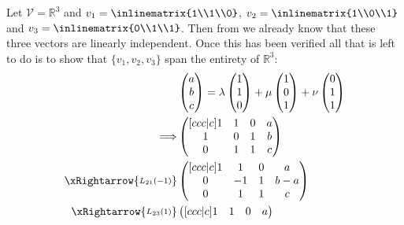 \begin{exm}\label{exm-vector-basis:2}
	Let $\mathcal{V}=\mathbb{R}^3$ and $v_1=\inlinematrix{1\\1\\0}$,
	$v_2=\inlinematrix{1\\0\\1}$ and $v_3=\inlinematrix{0\\1\\1}$. Then
	from  we already know
	that these three vectors are linearly independent. Once this has been
	verified all that is left to do is to show that $\{v_1,v_2,v_3\}$ span the
	entirety of $\mathbb{R}^3$:
	\begin{align*}
		 & \begin{pmatrix}
			a \\b\\c
		\end{pmatrix}=
		\lambda\begin{pmatrix}
			1 \\1\\0
		\end{pmatrix}+\mu\begin{pmatrix}
			1 \\0\\1
		\end{pmatrix}+\nu\begin{pmatrix}
			0 \\1\\1
		\end{pmatrix} \\
		\Longrightarrow
		 & \begin{pmatrix}[ccc|c]
			1 & 1 & 0 & a \\
			1 & 0 & 1 & b \\
			0 & 1 & 1 & c
		\end{pmatrix}                                                                 \\
		\xRightarrow{\substack{L_{21}(-1)}}
		 & \begin{pmatrix}[ccc|c]
			1 & 1  & 0 & a   \\
			0 & -1 & 1 & b-a \\
			0 & 1  & 1 & c
		\end{pmatrix}                                                                 \\
		\xRightarrow{\substack{L_{23}(1)}}
		 & \begin{pmatrix}[ccc|c]
			1 & 1 & 0 & a     \\

\end{pmatrix}
\end{align*}
\end{exm}
